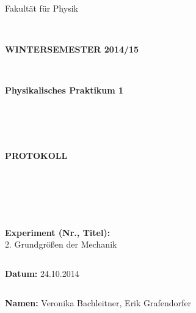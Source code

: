 \documentclass{article}
\begin{document}
\thispagestyle{empty}
			\begin{center}
			\Large{Fakultät für Physik}\\
			\end{center}
\begin{verbatim}


\end{verbatim}
			\begin{center}
			\textbf{\LARGE WINTERSEMESTER 2014/15}
			\end{center}
\begin{verbatim}


\end{verbatim}
			\begin{center}
			\textbf{\LARGE{Physikalisches Praktikum 1}}
			\end{center}
\begin{verbatim}




\end{verbatim}

			\begin{center}
			\textbf{\LARGE{PROTOKOLL}}
			\end{center}
			
\begin{verbatim}





\end{verbatim}

			\begin{flushleft}
			\textbf{\Large{Experiment (Nr., Titel):}}\\
			\LARGE{2. Grundgrößen der Mechanik}	
			\end{flushleft}

\begin{verbatim}

\end{verbatim}	
			\begin{flushleft}
			\textbf{\Large{Datum:}} \Large{24.10.2014}
			\end{flushleft}
			
\begin{verbatim}
\end{verbatim}
		\begin{flushleft}
			\textbf{\Large{Namen:}} \Large{Veronika Bachleitner, Erik Grafendorfer}
			\end{flushleft}
\end{document}
